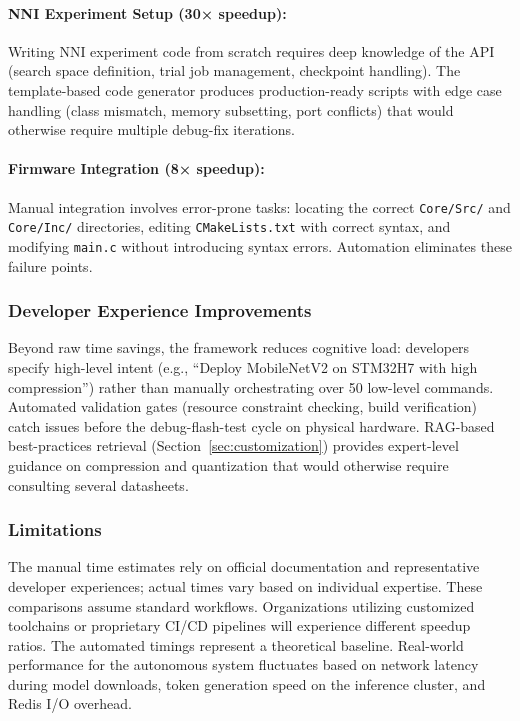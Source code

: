 \paragraph{NNI Experiment Setup (30× speedup):} Writing NNI experiment code from scratch requires deep knowledge of the API (search space definition, trial job management, checkpoint handling). The template-based code generator produces production-ready scripts with edge case handling (class mismatch, memory subsetting, port conflicts) that would otherwise require multiple debug-fix iterations.

\paragraph{Firmware Integration (8× speedup):} Manual integration involves error-prone tasks: locating the correct \texttt{Core/Src/} and \texttt{Core/Inc/} directories, editing \texttt{CMakeLists.txt} with correct syntax, and modifying \texttt{main.c} without introducing syntax errors. Automation eliminates these failure points.

\subsubsection{Developer Experience Improvements}

Beyond raw time savings, the framework reduces cognitive load: developers specify high-level intent (e.g., ``Deploy MobileNetV2 on STM32H7 with high compression'') rather than manually orchestrating over 50 low-level commands. Automated validation gates (resource constraint checking, build verification) catch issues before the debug-flash-test cycle on physical hardware. RAG-based best-practices retrieval (Section~\ref{sec:customization}) provides expert-level guidance on compression and quantization that would otherwise require consulting several datasheets.

\subsubsection{Limitations}

The manual time estimates rely on official documentation and representative developer experiences; actual times vary based on individual expertise. These comparisons assume standard workflows. Organizations utilizing customized toolchains or proprietary CI/CD pipelines will experience different speedup ratios. The automated timings represent a theoretical baseline. Real-world performance for the autonomous system fluctuates based on network latency during model downloads, token generation speed on the inference cluster, and Redis I/O overhead.


